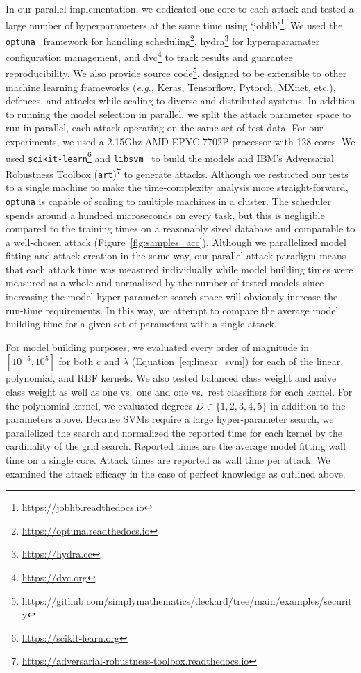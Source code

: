 \documentclass[fonts]{icst}
\begin{document}
In our parallel implementation, we dedicated one core to each attack and tested a large number of hyperparameters at the same time using `joblib'\footnote{\href{https://joblib.readthedocs.io}{https://joblib.readthedocs.io}}. We used the \texttt{optuna}~\cite{optuna} framework for handling scheduling\footnote{\href{https://optuna.readthedocs.io}{https://optuna.readthedocs.io}}, hydra\footnote{\href{https://hydra.cc}{https://hydra.cc}} for hyperaparamater configuration management, and dvc\footnote{\href{https://dvc.org}{https://dvc.org}} to track results and guarantee reproducibility. We also provide source code\footnote{\href{https://github.com/simplymathematics/deckard/}{https://github.com/simplymathematics/deckard/tree/main/examples/security}}, designed to be extensible to other machine learning frameworks (\textit{e.g.}, Keras, Tensorflow, Pytorch, MXnet, etc.), defences, and attacks while scaling to diverse and distributed systems. In addition to running the model selection in parallel, we split the attack parameter space to run in parallel, each attack operating on the same set of test data. For our experiments, we used a 2.15Ghz AMD EPYC 7702P processor with 128 cores. We used \texttt{scikit-learn}\footnote{\href{https://scikit-learn.org/}{https://scikit-learn.org}} and \texttt{libsvm}~\cite{chang2011libsvm} to build the models and IBM's Adversarial Robustness Toolbox (\texttt{art})\footnote{\href{https://adversarial-robustness-toolbox.readthedocs.io/}{https://adversarial-robustness-toolbox.readthedocs.io}} to generate attacks.  Although we restricted our tests to a single machine to make the time-complexity analysis more straight-forward, \texttt{optuna} is capable of scaling to multiple machines in a cluster. The scheduler spends around a hundred microseconds on every task, but this is negligible compared to the training times on a reasonably sized database and comparable to a well-chosen attack (Figure~\ref{fig:samples_acc}). Although we parallelized model fitting and attack creation in the same way, our parallel attack paradigm means that each attack time was measured individually while model building times were measured as a whole and normalized by the number of tested models since increasing the model hyper-parameter search space will obviously increase the run-time requirements. In this way, we attempt to compare the average model building time for a given set of parameters with a single attack.

For model building purposes, we evaluated every order of magnitude in $[10^{-5}, 10^5]$ for both $c$  and $\lambda$ (Equation~\ref{eq:linear_svm}) for each of the linear, polynomial, and RBF kernels. We also tested balanced class weight and naive class weight as well as one vs.~one and one vs.~rest classifiers for each kernel. For the polynomial kernel, we evaluated degrees $D\in\{1,2,3,4,5\}$ in addition to the parameters above. Because SVMs require a large hyper-parameter search, we parallelized the search and normalized the reported time for each kernel by the cardinality of the grid search. Reported times are the average model fitting  wall time on a single core. Attack times are reported as wall time per attack. We examined the attack efficacy in the case of perfect knowledge as outlined above.
\end{document}
